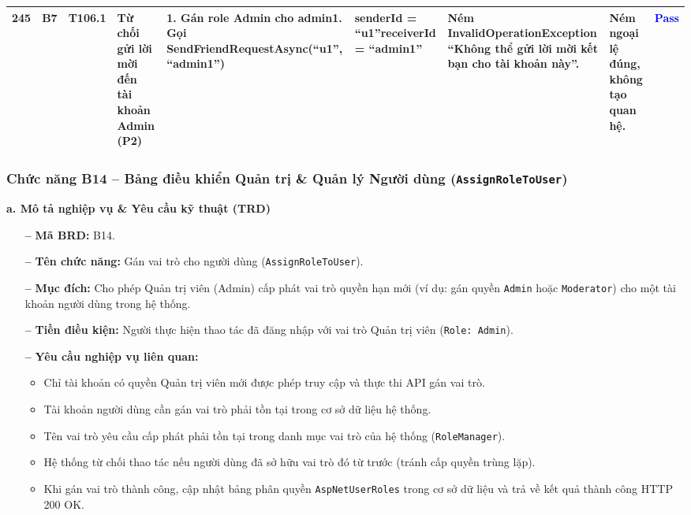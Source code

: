 \documentclass[11pt,a4paper]{article}
\begin{document}
\begin{longtable}{|C{0.8cm}|C{0.75cm}|C{0.95cm}|L{2.0cm}|L{3.0cm}|L{2.25cm}|L{2.6cm}|L{2.5cm}|C{0.85cm}|}
\textbf{245} & B7 & T106.1 & Từ chối gửi lời mời đến tài khoản Admin (P2) & 1. Gán role Admin cho admin1. Gọi SendFriend\allowbreak RequestAsync(``u1'', ``admin1'') & senderId = ``u1''\newline receiverId = ``admin1'' & Ném InvalidOperation\allowbreak Exception ``Không thể gửi lời mời kết bạn cho tài khoản này''. & Ném ngoại lệ đúng, không tạo quan hệ. & \textcolor{blue}{\textbf{Pass}} \\ \hline
\end{longtable}
\endgroup

\subsubsection[Chức năng B14 -- Quản trị \& Quản lý Người dùng (\texttt{AssignRoleToUser})]{Chức năng B14 -- Bảng điều khiển Quản trị \& Quản lý Người dùng (\texttt{AssignRoleToUser})}

\noindent\textbf{a. Mô tả nghiệp vụ \& Yêu cầu kỹ thuật (TRD)}
\begin{itemize}[leftmargin=1.2cm, noitemsep]
    \item[\textbf{--}] \textbf{Mã BRD:} B14.
    \item[\textbf{--}] \textbf{Tên chức năng:} Gán vai trò cho người dùng (\texttt{AssignRoleToUser}).
    \item[\textbf{--}] \textbf{Mục đích:} Cho phép Quản trị viên (Admin) cấp phát vai trò quyền hạn mới (ví dụ: gán quyền \texttt{Admin} hoặc \texttt{Moderator}) cho một tài khoản người dùng trong hệ thống.
    \item[\textbf{--}] \textbf{Tiền điều kiện:} Người thực hiện thao tác đã đăng nhập với vai trò Quản trị viên (\texttt{Role: Admin}).
    \item[\textbf{--}] \textbf{Yêu cầu nghiệp vụ liên quan:}
    \begin{itemize}[leftmargin=0.8cm, label=$\bullet$, noitemsep]
        \item Chỉ tài khoản có quyền Quản trị viên mới được phép truy cập và thực thi API gán vai trò.
        \item Tài khoản người dùng cần gán vai trò phải tồn tại trong cơ sở dữ liệu hệ thống.
        \item Tên vai trò yêu cầu cấp phát phải tồn tại trong danh mục vai trò của hệ thống (\texttt{RoleManager}).
        \item Hệ thống từ chối thao tác nếu người dùng đã sở hữu vai trò đó từ trước (tránh cấp quyền trùng lặp).
        \item Khi gán vai trò thành công, cập nhật bảng phân quyền \texttt{AspNetUserRoles} trong cơ sở dữ liệu và trả về kết quả thành công HTTP 200 OK.
    \end{itemize}
\end{itemize}
\end{document}
